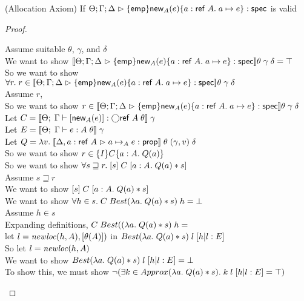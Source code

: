 \begin{lemma}{(Allocation Axiom)}
If $\judgeS{\spec{\emp}{\newref{A}{e}}{a:\reftype{A}}{a \pointsto e}}$ is valid
\end{lemma}
\begin{proof}
  \begin{tabbedproof}
    \oo Assume suitable $\theta$, $\gamma$, and $\delta$ \\
    \ooo We want to show $\interp{\judgeS{\spec{\emp}{\newref{A}{e}}{a:\reftype{A}}{a \pointsto e}}}\theta\;\gamma\;\delta = \top$ \\
    \ooo So we want to show $\forall r.\; r \in \interp{\judgeS{\spec{\emp}{\newref{A}{e}}{a:\reftype{A}}{a \pointsto e}}}\theta\;\gamma\;\delta$ \\
    \ooo Assume $r$, \\
    \oooo So we want to show $r \in \interp{\judgeS{\spec{\emp}{\newref{A}{e}}{a:\reftype{A}}{a \pointsto e}}}\theta\;\gamma\;\delta$ \\
    \oooo Let $C = \interp{\judgeE{\Gamma}{\comp{\newref{A}{e}}}{\monad{\reftype{A}}}\;\theta}\;\gamma$ \\
    \oooo Let $E = \interp{\judgeE{\Gamma}{e}{A}\;\theta}\;\gamma$ \\
    \oooo Let $Q = \semfun{v}{\interp{\judgeA[\Delta, a:\reftype{A}]{a \pointsto_A e}{\assert}}\;\theta\;(\gamma, v)\;\delta}$ \\
    \oooo So we want to show $r \in \spec{I}{C}{a:A}{Q(a)}$ \\
    \oooo So we want to show $\forall s \sqsupseteq r.\; \basicspec{s}{C}{a:A}{Q(a)*s}$ \\
    \oooo Assume $s \sqsupseteq r$ \\
    \ooooo We want to show $\basicspec{s}{C}{a:A}{Q(a)*s}$ \\
    \ooooo We want to show $\forall h \in s.\; C\;Best(\semfun{a}{Q(a)*s})\;h = \bot$ \\
    \ooooo Assume $h \in s$ \\
    \oooooo Expanding definitions, $C\;Best((\semfun{a}{Q(a)*s})\;h = $ \\
    \oooooox let $l = \newloc{h}{A}, [\theta(A)])$ in $Best(\semfun{a}{Q(a)*s})\;l\;[h|l:E]$ \\
    \oooooo So let $l = \newloc{h}{A}$ \\
    \oooooo We want to show $Best(\semfun{a}{Q(a)*s})\;l\;[h|l:E] = \bot$ \\
    \oooooo To show this, we must show $\lnot (\exists k \in Approx(\semfun{a}{Q(a)*s}).\;k\;l\;[h|l:E] = \top)$ \\

\end{tabbedproof}
\end{proof}
